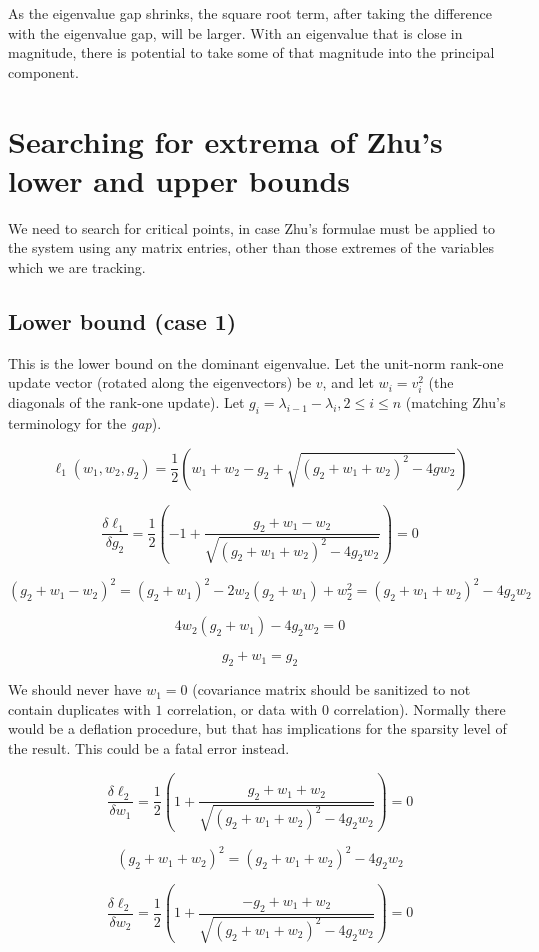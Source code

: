 \documentclass{article}
\begin{document}
As the eigenvalue gap shrinks, the square root term, after taking the difference with the eigenvalue gap, will be larger. With an eigenvalue that is close in magnitude, there is potential to take some of that magnitude into the principal component.

\section{Searching for extrema of Zhu's lower and upper bounds}

We need to search for critical points, in case Zhu's formulae must be applied to the system using any matrix entries, other than those extremes of the variables which we are tracking.

\subsection{Lower bound (case 1)}

This is the lower bound on the dominant eigenvalue. Let the unit-norm rank-one update vector (rotated along the eigenvectors) be $v$, and let $w_i = v_i^2$ (the diagonals of the rank-one update). Let $g_i = \lambda_{i-1} - \lambda_i, 2 \le i \le n$ (matching Zhu's terminology for the \textit{gap}).

$$
\ell_1(w_1, w_2, g_2) = \frac{1}{2} \left(w_1 + w_2 - g_2 + \sqrt{(g_2 + w_1 + w_2)^2 - 4g w_2} \right)
$$

$$
\frac{\delta \ell_1}{\delta g_2}
=
\frac{1}{2} \left(
    -1 + \frac{g_2 + w_1 - w_2}{\sqrt{(g_2+w_1+w_2)^2 - 4g_2w_2}}
\right)
= 0
$$

$$
(g_2 + w_1 - w_2)^2 = (g_2 + w_1)^2 - 2w_2(g_2 + w_1) + w_2^2 = (g_2+w_1+w_2)^2 - 4g_2w_2
$$

$$
4w_2(g_2 + w_1) - 4g_2w_2 = 0
$$

$$
g_2 + w_1 = g_2
$$

We should never have $w_1 = 0$ (covariance matrix should be sanitized to not contain duplicates with $1$ correlation, or data with $0$ correlation). Normally there would be a deflation procedure, but that has implications for the sparsity level of the result. This could be a fatal error instead.

$$
\frac{\delta \ell_2}{\delta w_1}
=
\frac{1}{2} \left( 1 + \frac{g_2 + w_1 + w_2}{\sqrt{(g_2 + w_1 + w_2)^2 - 4g_2 w_2}} \right)
= 0
$$

$$
(g_2 + w_1 + w_2)^2 = (g_2 + w_1 + w_2)^2 - 4g_2w_2
$$

$$
\frac{\delta \ell_2}{\delta w_2}
=
\frac{1}{2} \left( 1 + \frac{-g_2 + w_1 + w_2}{\sqrt{(g_2 + w_1 + w_2)^2 - 4g_2 w_2}} \right)
= 0
$$
\end{document}
